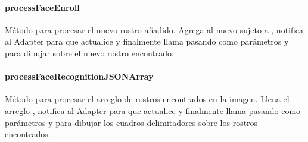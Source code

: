 \paragraph{processFaceEnroll}
\label{\detokenize{dev_docs:processfaceenroll}}

\begin{fulllineitems}
\label{\detokenize{dev_docs:com.lar.cloudnao.FaceRecognitionActivity.processFaceEnroll(JSONObject)}}
Método para procesar el nuevo rostro añadido. Agrega al nuevo sujeto a 
, notifica al Adapter para que actualice 
{\hyperref[\detokenize{dev_docs:com.lar.cloudnao.FaceRecognitionActivity.subjectRecognitionLV}]{}} y finalmente llama 
 pasando como parámetros  y 
{\hyperref[\detokenize{dev_docs:com.lar.cloudnao.OCRTranslationActivity.mRobotImage}]{}} para dibujar sobre el nuevo rostro encontrado.

\end{fulllineitems}



\paragraph{processFaceRecognitionJSONArray}
\label{\detokenize{dev_docs:processfacerecognitionjsonarray}}

\begin{fulllineitems}
\label{\detokenize{dev_docs:com.lar.cloudnao.FaceRecognitionActivity.processFaceRecognitionJSONArray(JSONArray)}}
Método para procesar el arreglo de rostros encontrados en la imagen. Llena el arreglo , notifica al Adapter para que actualice {\hyperref[\detokenize{dev_docs:com.lar.cloudnao.FaceRecognitionActivity.subjectRecognitionLV}]{}} y finalmente llama  pasando como parámetros  y {\hyperref[\detokenize{dev_docs:com.lar.cloudnao.OCRTranslationActivity.mRobotImage}]{}} para dibujar los cuadros delimitadores sobre los rostros encontrados.

\end{fulllineitems}



